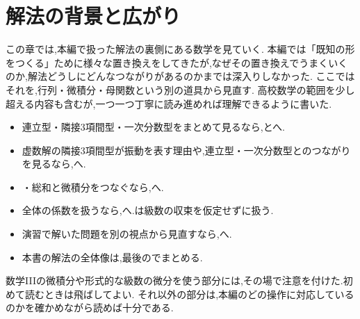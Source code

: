 
\chapter{解法の背景と広がり}\label{章：解法の背景と広がり}
\begin{bookcolumns}

  この章では,本編で扱った解法の裏側にある数学を見ていく.
  本編では「既知の形をつくる」ために様々な置き換えをしてきたが,なぜその置き換えでうまくいくのか,解法どうしにどんなつながりがあるのかまでは深入りしなかった.
  ここではそれを,行列・微積分・母関数という別の道具から見直す.
  高校数学の範囲を少し超える内容も含むが,一つ一つ丁寧に読み進めれば理解できるように書いた.
  \begin{itemize}
    \item 連立型・隣接3項間型・一次分数型をまとめて見るなら,とへ.
    \item 虚数解の隣接3項間型が振動を表す理由や,連立型・一次分数型とのつながりを見るなら,へ.
    \item {}・総和と微積分をつなぐなら,へ.
    \item {}全体の係数を扱うなら,へ.は級数の収束を仮定せずに扱う.
    \item 演習で解いた問題を別の視点から見直すなら,へ.
    \item 本書の解法の全体像は,最後のでまとめる.
  \end{itemize}
  数学IIIの微積分や形式的な級数の微分を使う部分には,その場で注意を付けた.初めて読むときは飛ばしてよい.
  それ以外の部分は,本編のどの操作に対応しているのかを確かめながら読めば十分である.



\end{bookcolumns}
